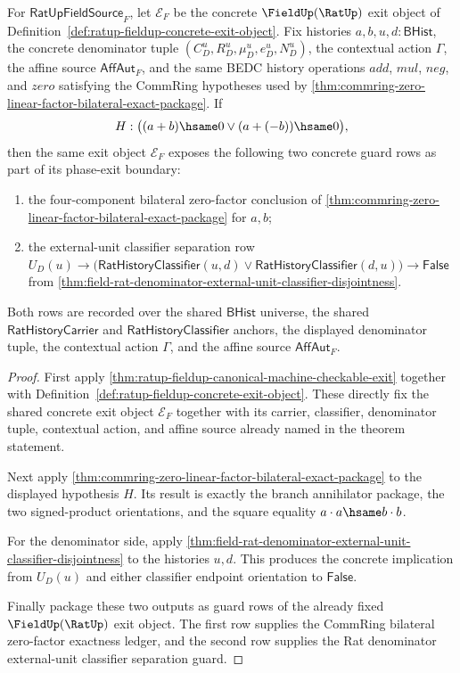 \begin{theorem}
\label{thm:ratup-fieldup-bilateral-zero-factor-external-unit-guard-package}
For $\mathsf{RatUpFieldSource}_F$, let $\mathcal E_F$ be the concrete
$\FieldUp(\RatUp)$ exit object of
Definition~\ref{def:ratup-fieldup-concrete-exit-object}. Fix histories
$a,b,u,d:\mathsf{BHist}$, the concrete denominator tuple
$(C_D^u,R_D^u,\mu_D^u,e_D^u,N_D^u)$, the contextual action $\Gamma$, the affine
source $\mathsf{AffAut}_F$, and the same BEDC history operations $add$, $mul$,
$neg$, and $zero$ satisfying the CommRing hypotheses used by
\autoref{thm:commring-zero-linear-factor-bilateral-exact-package}. If
$$
H:\bigl((a+b)\hsame0 \lor (a+(-b))\hsame0\bigr),
$$
then the same exit object $\mathcal E_F$ exposes the following two concrete
guard rows as part of its phase-exit boundary:
\begin{enumerate}
  \item the four-component bilateral zero-factor conclusion of
  \autoref{thm:commring-zero-linear-factor-bilateral-exact-package} for
  $a,b$;
  \item the external-unit classifier separation row
  $U_D(u)\to
  \bigl(\mathsf{RatHistoryClassifier}(u,d)\lor
  \mathsf{RatHistoryClassifier}(d,u)\bigr)\to\mathsf{False}$ from
  \autoref{thm:field-rat-denominator-external-unit-classifier-disjointness}.
\end{enumerate}
Both rows are recorded over the shared $\mathsf{BHist}$ universe, the shared
$\mathsf{RatHistoryCarrier}$ and $\mathsf{RatHistoryClassifier}$ anchors, the
displayed denominator tuple, the contextual action $\Gamma$, and the affine
source $\mathsf{AffAut}_F$.
\end{theorem}
\begin{proof}
First apply \autoref{thm:ratup-fieldup-canonical-machine-checkable-exit}
together with Definition~\ref{def:ratup-fieldup-concrete-exit-object}. These
directly fix the shared concrete exit object $\mathcal E_F$ together with its
carrier, classifier, denominator tuple, contextual action, and affine source
already named in the theorem statement.

Next apply
\autoref{thm:commring-zero-linear-factor-bilateral-exact-package} to the
displayed hypothesis $H$. Its result is exactly the branch annihilator package,
the two signed-product orientations, and the square equality
$a\cdot a\hsame b\cdot b$.

For the denominator side, apply
\autoref{thm:field-rat-denominator-external-unit-classifier-disjointness} to
the histories $u,d$. This produces the concrete implication from $U_D(u)$ and
either classifier endpoint orientation to $\mathsf{False}$.

Finally package these two outputs as guard rows of the already fixed
$\FieldUp(\RatUp)$ exit object. The first row supplies the CommRing bilateral
zero-factor exactness ledger, and the second row supplies the Rat denominator
external-unit classifier separation guard.
\end{proof}

